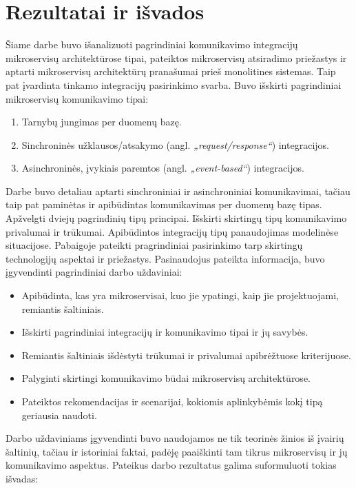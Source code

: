 \section{Rezultatai ir išvados}

Šiame darbe buvo išanalizuoti pagrindiniai komunikavimo integracijų mikroservisų architektūrose tipai, pateiktos mikroservisų
atsiradimo priežastys ir aptarti mikroservisų architektūrų pranašumai prieš monolitines sistemas. Taip pat įvardinta tinkamo integracijų 
pasirinkimo svarba. Buvo išskirti pagrindiniai mikroservisų komunikavimo tipai:

\begin{enumerate}
	\item Tarnybų jungimas per duomenų bazę.
	\item Sinchroninės užklausos/atsakymo (angl. \textit{„request/response“}) integracijos.
	\item Asinchroninės, įvykiais paremtos (angl. \textit{„event-based“}) integracijos.
\end{enumerate}

Darbe buvo detaliau aptarti sinchroniniai ir asinchroniniai komunikavimai, tačiau taip pat
paminėtas ir apibūdintas komunikavimas per duomenų bazę tipas.
Apžvelgti dviejų pagrindinių tipų principai. Išskirti skirtingų tipų komunikavimo privalumai ir trūkumai.
Apibūdintos integracijų tipų panaudojimas modelinėse situacijose. Pabaigoje pateikti pragrindiniai pasirinkimo tarp skirtingų technologijų
aspektai ir priežastys.
\break
Pasinaudojus pateikta informacija, buvo įgyvendinti pagrindiniai darbo uždaviniai:

\begin{itemize}
	\item Apibūdinta, kas yra mikroservisai, kuo jie ypatingi, kaip jie projektuojami, remiantis šaltiniais.
	\item Išskirti pagrindiniai integracijų ir komunikavimo tipai ir jų savybės.
	\item Remiantis šaltiniais išdėstyti trūkumai ir privalumai apibrėžtuose kriterijuose.
	\item Palyginti skirtingi komunikavimo būdai mikroservisų architektūrose.
	\item Pateiktos rekomendacijas ir scenarijai, kokiomis aplinkybėmis kokį tipą geriausia naudoti.
\end{itemize}

Darbo uždaviniams įgyvendinti buvo naudojamos ne tik teorinės žinios iš įvairių šaltinių, tačiau ir istoriniai faktai, 
padėję paaiškinti tam tikrus mikroservisų ir jų komunikavimo aspektus.
\break
Pateikus darbo rezultatus galima suformuluoti tokias išvadas:

